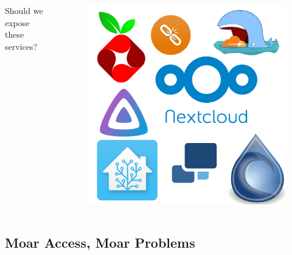 \documentclass{beamer}
\begin{document}
\begin{frame}
    \begin{columns}
        \begin{column}{0.5\textwidth}
            Should we expose these services?
        \end{column}
        \begin{column}{0.5\textwidth}
            \begin{figure}
                \centering
                \includegraphics[width=\textwidth,keepaspectratio]{../resources/logos.png}
            \end{figure}
        \end{column}
    \end{columns}
\end{frame}

\subsection{Moar Access, Moar Problems}
\end{document}
